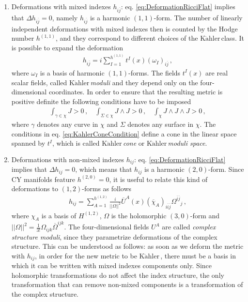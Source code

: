 \documentclass[12pt,a4paper]{book}
\newcommand{\Kahler}{\ensuremath{\text{K}\ddot{\text{a}}\text{hler}\,}}
\begin{document}
\begin{enumerate}
\item Deformations with mixed indexes $h_{i \overline{j}}$: eq. \eqref{eq:DeformationRicciFlat} implies that $\Delta h_{i \overline{j}} = 0$, namely $h_{i \overline{j}}$ is a harmonic $(1,1)$-form. The number of linearly independent deformations with mixed indexes then is counted by the Hodge number $h^{(1,1)}$, and they correspond to different choices of the \Kahler class. It is possible to expand the deformation
\begin{align}
\label{eq:KahlerModuli}
h_{i \overline{j}} = i \sum_{I = 1}^{h^{(1,1)}} t^I(x) \left(\omega_I\right)_{i \overline{j}} \,,
\end{align}
where $\omega_I$ is a basis of harmonic $(1,1)$-forms. The fields $t^I(x)$ are real scalar fields, called \textit{\Kahler moduli} and they depend only on the four-dimensional coordinates. In order to ensure that the resulting metric is positive definite the following conditions have to be imposed
\begin{align}
\label{eq:KahlerConeCondition}
\int_{\gamma \in \chi} J > 0 \,, \quad \int_{\Sigma \in \chi} J \wedge J > 0 \,, \quad \int_{\chi} J \wedge J \wedge J > 0 \,,
\end{align}
where $\gamma$ denotes any curve in $\chi$ and $\Sigma$ denotes any surface in $\chi$. The conditions in eq. \eqref{eq:KahlerConeCondition} define a cone in the linear space spanned by $t^I$, which is called \textit{\Kahler cone} or \textit{\Kahler moduli space}.
\item Deformations with non-mixed indexes $h_{ij}$: eq. \eqref{eq:DeformationRicciFlat} implies that $\Delta h_{ij} = 0$, which means that $h_{ij}$ is a harmonic $(2,0)$-form. Since CY manifolds feature $h^{(2,0)} = 0$, it is useful to relate this kind of deformations to $(1,2)$-forms as follows
\begin{align}
\label{eq:ComplexStructureDeformations}
h_{ij} = \sum_{A = 1}^{h^{(1,2)}} \frac{i}{||\Omega||^2} \overline{U}^A(x) \left(\overline{\chi}_A\right)_{i \overline{i} \overline{j}} {\Omega^{\overline{i} \overline{j}}}_j \,,
\end{align}
where $\chi_A$ is a basis of $H^{(1,2)}$, $\Omega$ is the holomorphic $(3,0)$-form and $||\Omega||^2 = \frac{1}{3!} \Omega_{ijk} \overline{\Omega}^{ijk}$. The four-dimensional fields $U^A$ are called \textit{complex structure moduli}, since they parametrize deformations of the complex structure. This can be understood as follows: as soon as we deform the metric with $h_{ij}$, in order for the new metric to be \Kahler, there must be a basis in which it can be written with mixed indexes components only. Since holomorphic transformations do not affect the index structure, the only transformation that can remove non-mixed components is a transformation of the complex structure.\\
\end{enumerate}
\end{document}
